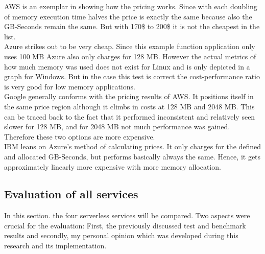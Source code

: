 \gls{AWS} is an exemplar in showing how the pricing works. Since with each doubling of memory execution time halves the price is exactly the same because also the GB-Seconds remain the same. But with 170\$ to 200\$ it is not the cheapest in the list.\\
Azure strikes out to be very cheap. Since this example function application only uses 100 \gls{MB} Azure also only charges for 128 \gls{MB}. However the actual metrics of how much memory was used does not exist for Linux and is only depicted in a graph for Windows. But in the case this test is correct the cost-performance ratio is very good for low memory applications.\\
Google generally conforms with the pricing results of \gls{AWS}. It positions itself in the same price region although it climbs in costs at 128 \gls{MB} and 2048 \gls{MB}. This can be traced back to the fact that it performed inconsistent and relatively seen slower for 128 MB, and for 2048 MB not much performance was gained. Therefore these two options are more expensive.\\
IBM leans on Azure's method of calculating prices. It only charges for the defined and allocated GB-Seconds, but performs basically always the same. Hence, it gets approximately linearly more expensive with more memory allocation.

\subsection{Evaluation of all services}
In this section. the four serverless services will be compared. Two aspects were crucial for the evaluation: First, the previously discussed test and benchmark results and secondly, my personal opinion which was developed during this research and its implementation.
